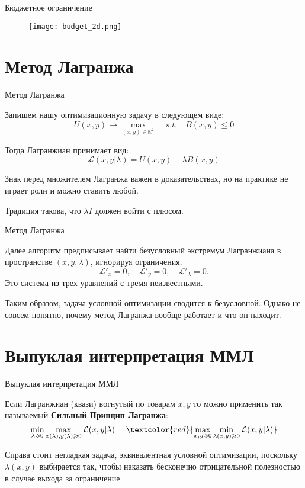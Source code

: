 \documentclass{beamer}
\begin{document}
\begin{frame}{Бюджетное ограничение}

\begin{figure}[hbt]
\centering
\texttt{[image: budget\_2d.png]}
\end{figure}

\end{frame}

\section{Метод Лагранжа}

\begin{frame}{Метод Лагранжа}

Запишем нашу оптимизационную задачу в следующем виде:
$$ U(x, y) \to \max_{(x,y) \in \mathbb{R}^2_{+}} \quad s.t.\quad  B(x,y) \leqslant 0$$

Тогда Лагранжиан принимает вид:
$$ \mathcal{L}(x, y | \lambda) = U(x,y) - \lambda B(x,y)$$

Знак перед множителем Лагранжа важен в доказательствах, но на практике не играет роли и можно ставить любой.

Традиция такова, что $\lambda I$ должен войти с плюсом.

\end{frame}

\begin{frame}{Метод Лагранжа}

Далее алгоритм предписывает найти безусловный экстремум Лагранжиана в пространстве $(x, y, \lambda)$, игнорируя ограничения.
$$ \mathcal{L}'_x = 0, \quad \mathcal{L}'_y = 0, \quad \mathcal{L}'_{\lambda} = 0.$$
Это система из трех уравнений с тремя неизвестными.

Таким образом, задача условной оптимизации сводится к безусловной. Однако не совсем понятно, почему метод Лагранжа вообще работает и что он находит.

\end{frame}

\section{Выпуклая интерпретация ММЛ}

\begin{frame}{Выпуклая интерпретация ММЛ}

Если Лагранжиан (квази) вогнутый по товарам $x,y$ то можно применить так называемый \textbf{Сильный Принцип Лагранжа}:
$$ \min_{\lambda \geqslant 0} \max_{x(\lambda),y(\lambda) \geqslant 0} \mathcal{L}(x,y | \lambda) = \textcolor{red}{\max_{x,y \geqslant 0} \min_{\lambda(x,y) \geqslant 0} \mathcal{L}(x,y | \lambda)} $$ 

Справа стоит негладкая задача, эквивалентная условной оптимизации, поскольку $\lambda(x,y)$ выбирается так, чтобы наказать бесконечно отрицательной полезностью в случае выхода за ограничение.

\end{frame}
\end{document}
